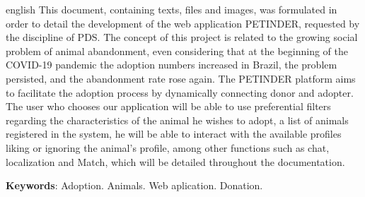 \begin{resumo}[Abstract]
 \begin{otherlanguage*}{english}
   This document, containing texts, files and images, was formulated in order to detail the development of the web application PETINDER, requested by the discipline of \ac{PDS}. The concept of this project is related to the growing social problem of animal abandonment, even considering that at the beginning of the \gls{COVID-19} pandemic the adoption numbers increased in Brazil, the problem persisted, and the abandonment rate rose again. The PETINDER platform aims to facilitate the adoption process by dynamically connecting donor and adopter. The user who chooses our application will be able to use preferential filters regarding the characteristics of the animal he wishes to adopt, a list of animals registered in the system, he will be able to interact with the available profiles liking or ignoring the animal's profile, among other functions such as chat, localization and \gls{Match}, which will be detailed throughout the documentation.


   \vspace{\onelineskip}

   \noindent 
   \textbf{Keywords}: Adoption. Animals. Web aplication. Donation.
 \end{otherlanguage*}
\end{resumo}